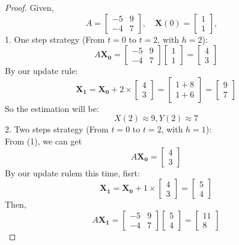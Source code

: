 \documentclass{article}
\begin{document}
\begin{proof}
    Given,
    \[ A = 
        \begin{bmatrix}
            -5 & 9 \\ -4 & 7
        \end{bmatrix},
        \quad
        \mathbf{X}(0) = 
        \begin{bmatrix}
            1 \\ 1
        \end{bmatrix},
        \quad
    \]
    1. One step strategy (From $t = 0$ to $t = 2$, with $h = 2$):
    \\
    \[ A\mathbf{X_0} = \begin{bmatrix} -5 & 9 \\ -4 & 7 \end{bmatrix} \begin{bmatrix} 1 \\ 1 \end{bmatrix} = \begin{bmatrix} 4 \\ 3 \end{bmatrix} \]
    By our update rule:
    \[ \mathbf{X_1} = \mathbf{X_0} + 2 \times \begin{bmatrix} 4 \\ 3 \end{bmatrix} = \begin{bmatrix} 1 + 8 \\ 1 + 6 \end{bmatrix} = \begin{bmatrix} 9 \\ 7 \end{bmatrix} \]
    So the estimation will be:
    \[ X(2) \approx 9, Y(2) \approx 7 \]
    2. Two steps strategy (From $t = 0$ to $t = 2$, with $h = 1$):
    \\
    From (1), we can get
    \[ A\mathbf{X_0} = \begin{bmatrix} 4 \\ 3 \end{bmatrix} \]
    By our update rulem this time, fisrt:
    \[ \mathbf{X_1} = \mathbf{X_0} + 1 \times \begin{bmatrix} 4 \\ 3 \end{bmatrix} = \begin{bmatrix} 5 \\ 4 \end{bmatrix} \]
    Then,
    \[ A\mathbf{X_1} = \begin{bmatrix} -5 & 9 \\ -4 & 7 \end{bmatrix} \begin{bmatrix} 5 \\ 4 \end{bmatrix} = \begin{bmatrix} 11 \\ 8\end{bmatrix} \]

\end{proof}
\end{document}

